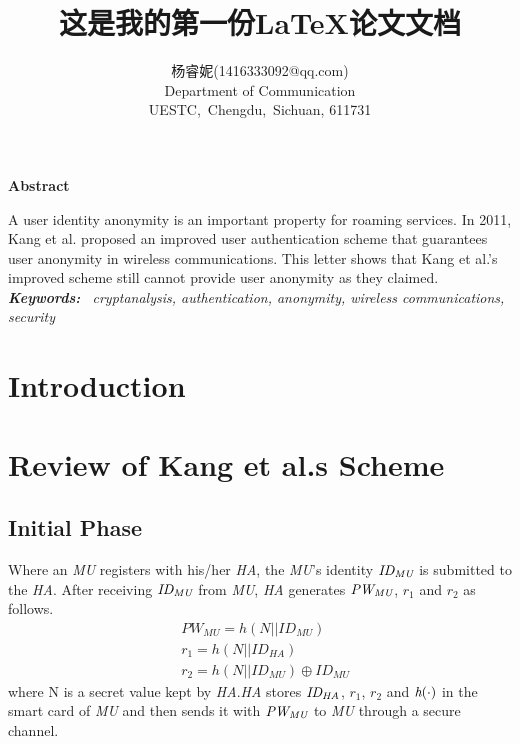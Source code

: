 \documentclass{article}
\title{这是我的第一份\LaTeX{}论文文档}
\author{杨睿妮(1416333092@qq.com) \\Department of Communication \\
UESTC,\ Chengdu,\ Sichuan, 611731}
\begin{document}
    {
        \maketitle
        \begin{center}
        \textbf{Abstract} \\
        \end{center}
        \qquad A user identity anonymity is an important property for roaming services. In 2011, Kang et al. proposed an improved user authentication scheme that guarantees user anonymity in wireless communications. This letter shows that Kang et al.'s improved scheme still cannot provide user anonymity as they claimed.\\
        \indent \emph{\textbf{Keywords:} \ cryptanalysis, authentication, anonymity, wireless communications, security} \\
        \section{Introduction}
    }
\section{Review of Kang et al.s Scheme}
\subsection{Initial Phase}
Where an \emph{MU} registers with his/her \emph{HA}, the \emph{MU}'s identity $\emph{ID}_{\emph{MU}}$ is submitted to the \emph{HA}. After receiving $\emph{ID}_{\emph{MU}}$ from \emph{MU}, \emph{HA} generates $\emph{PW}_{\emph{MU}}$, $r_1$ and $r_2$ as follows. \\
\begin{align}
    & PW_{MU} = h(N||ID_{MU}) \\
    & r_1 = h(N||ID_{HA}) \\
    & r_2 = h(N||ID_{MU}) \oplus {ID}_{MU}     
\end{align}
where N is a secret value kept by \emph{HA}.\emph{HA} stores $\emph{ID}_{\emph{HA}}$, $r_1$, $r_2$ and $\emph{h}(\cdot)$ in the smart card of \emph{MU} and then sends it with $\emph{PW}_{\emph{MU}}$ to \emph{MU} through a secure channel.
\end{document}
